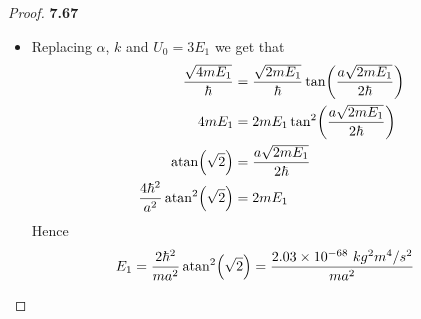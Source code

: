 \documentclass[11pt]{article}
\newcommand{\sci}[1]{\times 10^{#1}}
\theoremstyle{definition}
\begin{document}
\begin{proof}{\textbf{7.67}}
\begin{itemize}
\cleardoublepage
\item [\textbf{(c)}]
Replacing $\alpha$, $k$ and $U_0 = 3E_1$ we get that
\begin{align*}
    \frac{\sqrt{4mE_1}}{\hbar}
    &= \frac{\sqrt{2mE_1}}{\hbar}\tan(\frac{a\sqrt{2mE_1}}{2\hbar})\\
    4mE_1 &= 2mE_1\tan[2](\frac{a\sqrt{2mE_1}}{2\hbar})\\
    \atan(\sqrt{2}) &= \frac{a\sqrt{2mE_1}}{2\hbar}\\
    \frac{4\hbar^2}{a^2}\atan[2](\sqrt{2}) &= 2mE_1
\end{align*}
Hence
\begin{align*}
    E_1 &= \frac{2\hbar^2}{ma^2}\atan[2](\sqrt{2})
    = \frac{2.03\sci{-68}~kg^2m^4/s^2}{ma^2}
\end{align*}

\end{itemize}
\end{proof}
\end{document}
